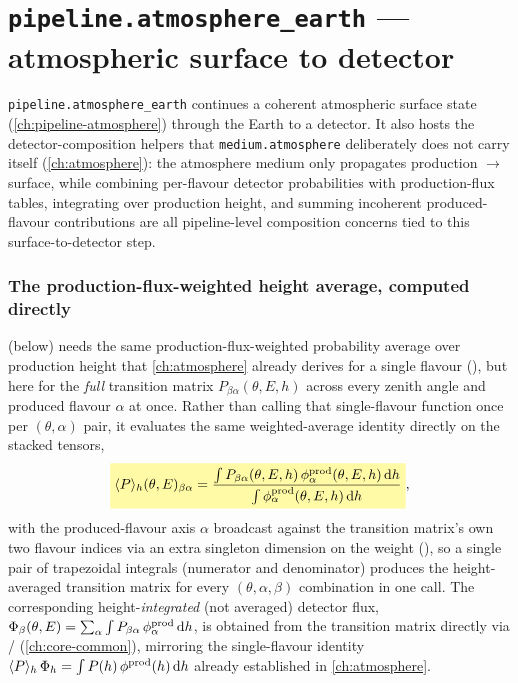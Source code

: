 \chapter{\texttt{pipeline.atmosphere\_earth} --- atmospheric surface to detector}
\label{ch:pipeline-atmosphere-earth}

\texttt{pipeline.atmosphere\_earth} continues a coherent atmospheric
surface state (\cref{ch:pipeline-atmosphere}) through the Earth to a
detector. It also hosts the detector-composition helpers that
\texttt{medium.atmosphere} deliberately does not carry itself
(\cref{ch:atmosphere}): the atmosphere medium only propagates production
$\to$ surface, while combining per-flavour detector probabilities with
production-flux tables, integrating over production height, and summing
incoherent produced-flavour contributions are all pipeline-level composition
concerns tied to this surface-to-detector step.

\begin{theorybox}
\subsection*{The production-flux-weighted height average, computed directly}
 (below) needs the same
production-flux-weighted probability average over production height that
\cref{ch:atmosphere} already derives for a single flavour
(), but here for the
\emph{full} transition matrix $P_{\beta\alpha}(\theta,E,h)$ across every
zenith angle and produced flavour $\alpha$ at once. Rather than calling
that single-flavour function once per $(\theta,\alpha)$ pair, it evaluates
the same weighted-average identity directly on the stacked tensors,
\begin{equation}
  \keyresult{\langle P\rangle_h(\theta,E)_{\beta\alpha}
  = \frac{\int P_{\beta\alpha}(\theta,E,h)\,\phi^{\rm prod}_\alpha(\theta,E,h)\,\mathrm{d}h}
         {\int \phi^{\rm prod}_\alpha(\theta,E,h)\,\mathrm{d}h}},
\end{equation}
with the produced-flavour axis $\alpha$ broadcast against the transition
matrix's own two flavour indices via an extra singleton dimension on the
weight (), so a single pair of
trapezoidal integrals (numerator and denominator) produces the
height-averaged transition matrix for every $(\theta,\alpha,\beta)$
combination in one call. The corresponding height-\emph{integrated} (not
averaged) detector flux, $\Phi_\beta(\theta,E)=\sum_\alpha\int
P_{\beta\alpha}\,\phi^{\rm prod}_\alpha\,\mathrm{d}h$, is obtained from the
transition matrix directly via
/
(\cref{ch:core-common}), mirroring the single-flavour identity
$\langle P\rangle_h\,\Phi_h=\int P(h)\,\phi^{\rm prod}(h)\,\mathrm{d}h$
already established in \cref{ch:atmosphere}.
\end{theorybox}

